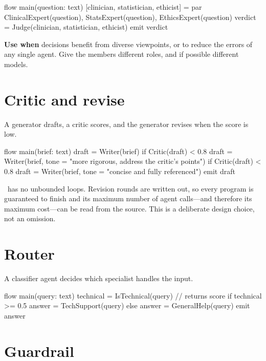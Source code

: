\begin{algo}
flow main(question: text) {
    [clinician, statistician, ethicist] = par {
        ClinicalExpert(question), StatsExpert(question), EthicsExpert(question)
    }
    verdict = Judge(clinician, statistician, ethicist)
    emit verdict
}
\end{algo}

\textbf{Use when} decisions benefit from diverse viewpoints, or to reduce the errors of any single agent. Give the members different roles, and if possible different models.

\section{Critic and revise}

A generator drafts, a critic scores, and the generator revises when the score is low.

\begin{algo}
flow main(brief: text) {
    draft = Writer(brief)
    if Critic(draft) < 0.8 {
        draft = Writer(brief, tone = "more rigorous, address the critic's points")
    }
    if Critic(draft) < 0.8 {
        draft = Writer(brief, tone = "concise and fully referenced")
    }
    emit draft
}
\end{algo}

\begin{note}
\algolang\ has no unbounded loops. Revision rounds are written out, so every program is guaranteed to finish and its maximum number of agent calls---and therefore its maximum cost---can be read from the source. This is a deliberate design choice, not an omission.
\end{note}

\section{Router}

A classifier agent decides which specialist handles the input.

\begin{algo}
flow main(query: text) {
    technical = IsTechnical(query)          // returns score
    if technical >= 0.5 {
        answer = TechSupport(query)
    } else {
        answer = GeneralHelp(query)
    }
    emit answer
}
\end{algo}

\section{Guardrail}

